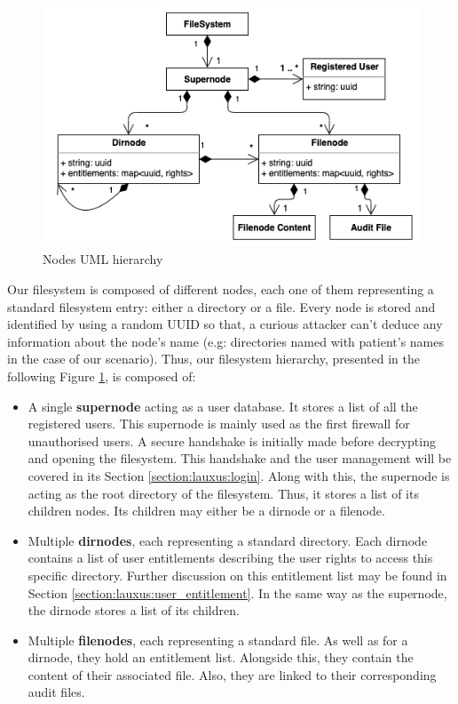 \documentclass[../main.tex]{subfiles}
\begin{document}
\begin{figure}[h]
    \centering
    \includegraphics[width=.75\textwidth]{images/lauxus/node_hierarchy}
    
    \caption{Nodes UML hierarchy}
    \label{figure:lauxus:nodes_hierarchy}
\end{figure}
\par Our filesystem is composed of different nodes, each one of them representing a standard filesystem entry: either a directory or a file. Every node is stored and identified by using a random UUID so that, a curious attacker can't deduce any information about the node's name (e.g: directories named with patient's names in the case of our scenario). Thus, our filesystem hierarchy, presented in the following Figure \ref{figure:lauxus:nodes_hierarchy}, is composed of:
\begin{itemize}
    \item A single \textbf{supernode} acting as a user database. It stores a list of all the registered users. This supernode is mainly used as the first firewall for unauthorised users. A secure handshake is initially made before decrypting and opening the filesystem. This handshake and the user management will be covered in its Section \ref{section:lauxus:login}. Along with this, the supernode is acting as the root directory of the filesystem. Thus, it stores a list of its children nodes. Its children may either be a dirnode or a filenode.
    \item Multiple \textbf{dirnodes}, each representing a standard directory. Each dirnode contains a list of user entitlements describing the user rights to access this specific directory. Further discussion on this entitlement list may be found in Section \ref{section:lauxus:user_entitlement}. In the same way as the supernode, the dirnode stores a list of its children.
    \item Multiple \textbf{filenodes}, each representing a standard file. As well as for a dirnode, they hold an entitlement list. Alongside this, they contain the content of their associated file. Also, they are linked to their corresponding audit files.
\end{itemize}
\end{document}
